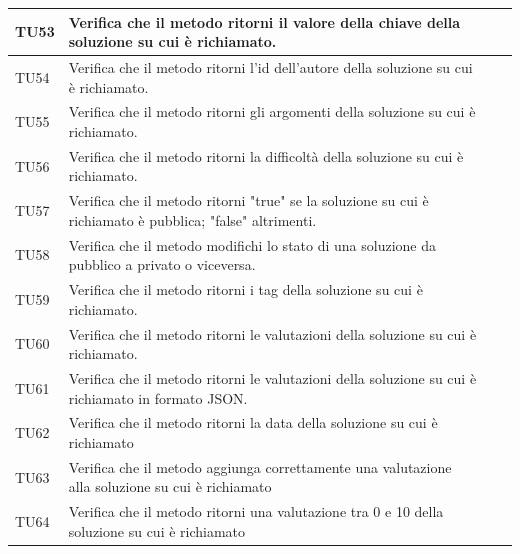 \begin{longtable}{|>{\centering\arraybackslash}m{1.6cm}|>{\centering\arraybackslash}m{6.41cm}|>{\centering\arraybackslash}m{3.1cm}| c |}
		TU53 & Verifica che il metodo ritorni il valore della chiave della soluzione su cui è richiamato.  \\ \hline
		TU54 & Verifica che il metodo ritorni l'id dell'autore della soluzione su cui è richiamato. \\ \hline
		TU55 & Verifica che il metodo ritorni gli argomenti della soluzione su cui è richiamato. \\ \hline
		TU56 & Verifica che il metodo ritorni la difficoltà della soluzione su cui è richiamato. \\ \hline
		TU57 & Verifica che il metodo ritorni "true" se la soluzione su cui è richiamato è pubblica; "false" altrimenti. \\ \hline
		TU58 & Verifica che il metodo modifichi lo stato di una soluzione da pubblico a privato o viceversa. \\ \hline
		TU59 & Verifica che il metodo ritorni i tag della soluzione su cui è richiamato. \\ \hline
		TU60 & Verifica che il metodo ritorni le valutazioni della soluzione su cui è richiamato. \\ \hline
		TU61 & Verifica che il metodo ritorni le valutazioni della soluzione su cui è richiamato in formato JSON.\\ \hline
		TU62 & Verifica che il metodo ritorni la data della soluzione su cui è richiamato \\ \hline
		TU63 & Verifica che il metodo aggiunga correttamente una valutazione alla soluzione su cui è richiamato\\ \hline
		TU64 & Verifica che il metodo ritorni una valutazione tra 0 e 10 della soluzione su cui è richiamato \\ \hline
		

\end{longtable}
